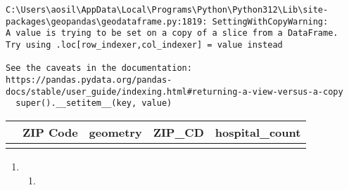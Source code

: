 \documentclass[
  letterpaper,
  DIV=11,
  numbers=noendperiod]{scrartcl}
\providecommand{\tightlist}{%
  \setlength{\itemsep}{0pt}\setlength{\parskip}{0pt}}\usepackage{longtable,booktabs,array}
\begin{document}
\begin{verbatim}
C:\Users\aosil\AppData\Local\Programs\Python\Python312\Lib\site-packages\geopandas\geodataframe.py:1819: SettingWithCopyWarning: 
A value is trying to be set on a copy of a slice from a DataFrame.
Try using .loc[row_indexer,col_indexer] = value instead

See the caveats in the documentation: https://pandas.pydata.org/pandas-docs/stable/user_guide/indexing.html#returning-a-view-versus-a-copy
  super().__setitem__(key, value)
\end{verbatim}

\begin{longtable}[]{@{}lllll@{}}
\toprule\noalign{}
& ZIP Code & geometry & ZIP\_CD & hospital\_count \\
\midrule\noalign{}
\endhead
\bottomrule\noalign{}
\endlastfoot
\end{longtable}

\begin{enumerate}
\def\labelenumi{\arabic{enumi}.}
\setcounter{enumi}{3}
\tightlist
\item
  \begin{enumerate}
  \def\labelenumii{\alph{enumii}.}
  \tightlist
  \item
  \end{enumerate}
\end{enumerate}
\end{document}
